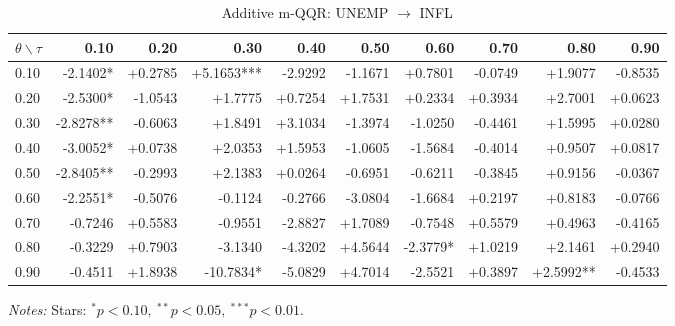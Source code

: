 \begin{table}[!htbp]
  \centering
  \caption{Additive m-QQR: UNEMP $\to$ INFL}
  \label{tab:amqqr_UNEMP}
  \begin{tabular}{lrrrrrrrrr}
    \toprule
    $\theta \backslash \tau$ & 0.10 & 0.20 & 0.30 & 0.40 & 0.50 & 0.60 & 0.70 & 0.80 & 0.90 \\
    \midrule
    0.10 & -2.1402* & +0.2785 & +5.1653*** & -2.9292 & -1.1671 & +0.7801 & -0.0749 & +1.9077 & -0.8535 \\
    0.20 & -2.5300* & -1.0543 & +1.7775 & +0.7254 & +1.7531 & +0.2334 & +0.3934 & +2.7001 & +0.0623 \\
    0.30 & -2.8278** & -0.6063 & +1.8491 & +3.1034 & -1.3974 & -1.0250 & -0.4461 & +1.5995 & +0.0280 \\
    0.40 & -3.0052* & +0.0738 & +2.0353 & +1.5953 & -1.0605 & -1.5684 & -0.4014 & +0.9507 & +0.0817 \\
    0.50 & -2.8405** & -0.2993 & +2.1383 & +0.0264 & -0.6951 & -0.6211 & -0.3845 & +0.9156 & -0.0367 \\
    0.60 & -2.2551* & -0.5076 & -0.1124 & -0.2766 & -3.0804 & -1.6684 & +0.2197 & +0.8183 & -0.0766 \\
    0.70 & -0.7246 & +0.5583 & -0.9551 & -2.8827 & +1.7089 & -0.7548 & +0.5579 & +0.4963 & -0.4165 \\
    0.80 & -0.3229 & +0.7903 & -3.1340 & -4.3202 & +4.5644 & -2.3779* & +1.0219 & +2.1461 & +0.2940 \\
    0.90 & -0.4511 & +1.8938 & -10.7834* & -5.0829 & +4.7014 & -2.5521 & +0.3897 & +2.5992** & -0.4533 \\
    \bottomrule
  \end{tabular}
  \par\medskip\footnotesize\textit{Notes:} Stars: $^*p<0.10,\ ^{**}p<0.05,\ ^{***}p<0.01$.
\end{table}